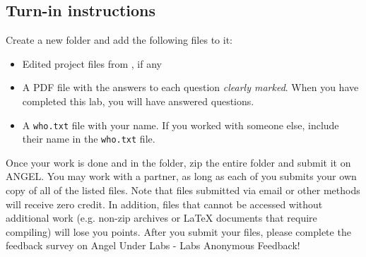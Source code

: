 \subsection*{Turn-in instructions}
Create a new folder and add the following files to it:
\begin{itemize}
\item Edited project files from \productname, if any
\item A PDF file with the answers to each question \textit{clearly marked}. When you have completed this lab, you will have answered  questions.
\item A \verb!who.txt! file with your name. If you worked with someone else, include their name in the \verb!who.txt! file.
\end{itemize}

Once your work is done and in the folder, zip the entire folder and submit it on ANGEL. You may work with a partner, as long as each of you submits your own copy of all of the listed files. Note that files submitted via email or other methods will receive zero credit. In addition, files that cannot be accessed without additional work (e.g. non-zip archives or LaTeX documents that require compiling) will lose you points. After you submit your files, please complete the feedback survey on Angel Under Labs - Labs Anonymous Feedback!
